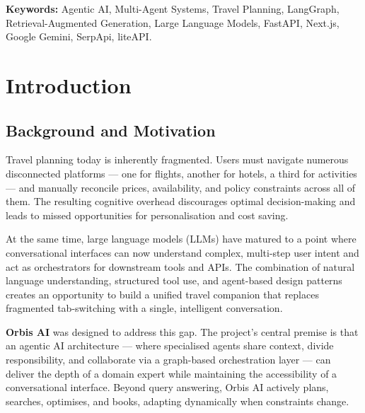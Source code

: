 \documentclass[12pt, a4paper]{article}
\begin{document}
\vspace{1em}
\noindent\textbf{Keywords:} Agentic AI, Multi-Agent Systems, Travel Planning, LangGraph, Retrieval-Augmented Generation, Large Language Models, FastAPI, Next.js, Google Gemini, SerpApi, liteAPI.

\newpage
\tableofcontents
\newpage


\section{Introduction}

\subsection{Background and Motivation}

Travel planning today is inherently fragmented. Users must navigate numerous disconnected platforms --- one for flights, another for hotels, a third for activities --- and manually reconcile prices, availability, and policy constraints across all of them. The resulting cognitive overhead discourages optimal decision-making and leads to missed opportunities for personalisation and cost saving.

At the same time, large language models (LLMs) have matured to a point where conversational interfaces can now understand complex, multi-step user intent and act as orchestrators for downstream tools and APIs. The combination of natural language understanding, structured tool use, and agent-based design patterns creates an opportunity to build a unified travel companion that replaces fragmented tab-switching with a single, intelligent conversation.

\textbf{Orbis AI} was designed to address this gap. The project's central premise is that an agentic AI architecture --- where specialised agents share context, divide responsibility, and collaborate via a graph-based orchestration layer --- can deliver the depth of a domain expert while maintaining the accessibility of a conversational interface. Beyond query answering, Orbis AI actively plans, searches, optimises, and books, adapting dynamically when constraints change.
\end{document}
